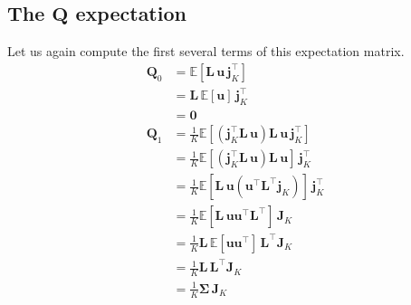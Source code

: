 \documentclass[modern]{aastex62}
\begin{document}
\subsection{The $\mathbf{Q}$ expectation}
%
Let us again compute the first several terms of this expectation matrix.
%
\begin{align}
    \mathbf{Q}_0 & = \mathbb{E}\left[ \mathbf{L} \, \mathbf{u} \, \mathbf{j}_K^\top \right]
    \nonumber                                                                                                                                                  \\
                 & = \mathbf{L} \, \mathbb{E}\left[  \mathbf{u} \right] \, \mathbf{j}_K^\top
    \nonumber                                                                                                                                                  \\
                 & = \mathbf{0}
    \\[1em]
    \mathbf{Q}_1 & = \frac{1}{K}\mathbb{E}\left[ \left(\mathbf{j}_K^\top \mathbf{L} \, \mathbf{u}\right) \mathbf{L} \, \mathbf{u} \, \mathbf{j}_K^\top \right]
    \nonumber                                                                                                                                                  \\
                 & = \frac{1}{K}\mathbb{E}\left[ \left(\mathbf{j}_K^\top \mathbf{L} \, \mathbf{u}\right) \mathbf{L} \, \mathbf{u} \right] \, \mathbf{j}_K^\top
    \nonumber                                                                                                                                                  \\
                 & = \frac{1}{K}\mathbb{E}\left[ \mathbf{L} \, \mathbf{u} (\mathbf{u}^\top \mathbf{L}^\top \mathbf{j}_K) \right] \, \mathbf{j}_K^\top
    \nonumber                                                                                                                                                  \\
                 & = \frac{1}{K}\mathbb{E}\left[ \mathbf{L} \, \mathbf{u} \mathbf{u}^\top \mathbf{L}^\top  \right] \, \mathbf{J}_K
    \nonumber                                                                                                                                                  \\
                 & = \frac{1}{K}\mathbf{L} \, \mathbb{E}\left[  \mathbf{u} \mathbf{u}^\top   \right]  \, \mathbf{L}^\top \mathbf{J}_K
    \nonumber                                                                                                                                                  \\
                 & = \frac{1}{K}\mathbf{L} \, \mathbf{L}^\top \mathbf{J}_K
    \nonumber                                                                                                                                                  \\
                 & = \frac{1}{K}\pmb{\Sigma} \, \mathbf{J}_K
\end{align}
\end{document}
